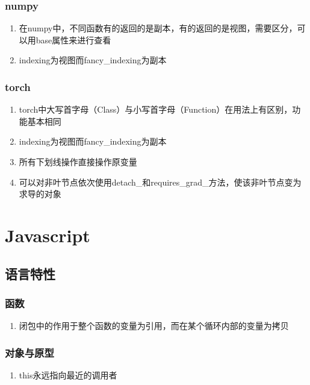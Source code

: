 \documentclass[onecolumn]{article}
\begin{document}
        \subsubsection{numpy}
            \noindent
            \begin{enumerate}
                \item 在numpy中，不同函数有的返回的是副本，有的返回的是视图，需要区分，可以用base属性来进行查看
                \item indexing为视图而fancy\_indexing为副本
            \end{enumerate}
        \subsubsection{torch}
            \noindent
            \begin{enumerate}
                \item torch中大写首字母（Class）与小写首字母（Function）在用法上有区别，功能基本相同
                \item indexing为视图而fancy\_indexing为副本
                \item 所有下划线操作直接操作原变量
                \item 可以对非叶节点依次使用detach\_和requires\_grad\_方法，使该非叶节点变为求导的对象
            \end{enumerate}
\newpage
\section{Javascript}
    \subsection{语言特性}
        \subsubsection{函数}
            \noindent
            \begin{enumerate}
                \item 闭包中的作用于整个函数的变量为引用，而在某个循环内部的变量为拷贝
            \end{enumerate}
        \subsubsection{对象与原型}
            \noindent
            \begin{enumerate}
                \item this永远指向最近的调用者
            \end{enumerate}
\newpage
\end{document}
